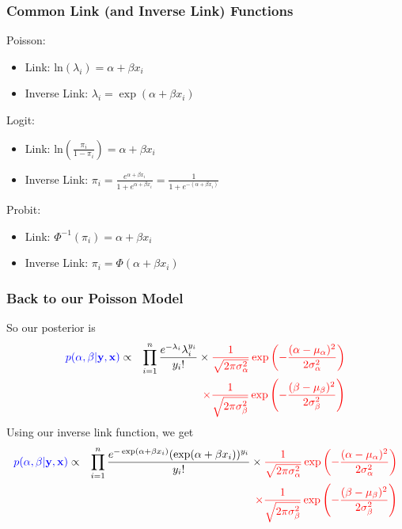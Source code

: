 \documentclass[handout]{beamer}
\begin{document}
\begin{frame}
\frametitle{Common Link (and Inverse Link) Functions}
\pause
Poisson:
\begin{itemize}
\item Link: $\mathrm{ln} (\lambda_i) = \alpha + \beta x_i$
\item Inverse Link: $\lambda_i = \exp (\alpha + \beta x_i)$
\end{itemize}
\pause
Logit:
\begin{itemize}
\item Link: $\mathrm{ln} \left( \frac{\pi_i}{1-\pi_i} \right) = \alpha +
\beta x_i$
\item Inverse Link: $\pi_i = \frac{e^{\alpha + \beta x_i}}{1 + e^{\alpha + \beta x_i}} = \frac{1}{1 + e^{-(\alpha + \beta x_i)}}$
\end{itemize}
\pause
Probit:
\begin{itemize}
\item Link: $\Phi^{-1}(\pi_i) = \alpha + \beta x_i$
\item Inverse Link: $\pi_i = \Phi(\alpha + \beta x_i)$
\end{itemize}
\end{frame}

\begin{frame}
\frametitle{Back to our Poisson Model}
\pause
So our posterior is 
\footnotesize
\begin{eqnarray*}
\textcolor{blue}{p(\alpha, \beta | \mathbf{y}, \mathbf{x})} &\propto&
\prod_{i=1}^n \frac{e^{-\lambda_i} \lambda_i^{y_i}}{y_i !} \times
\textcolor{red}{\frac{1}{\sqrt{2\pi \sigma^2_{\alpha}}} \exp \left(-
\frac{(\alpha - \mu_{\alpha})^2}{2 \sigma_{\alpha}^2}\right)}\\
&\phantom{\propto}& \textcolor{red}{\times \frac{1}{\sqrt{2\pi \sigma^2_{\beta}}} \exp \left(-\frac{(\beta - \mu_{\beta})^2}{2 \sigma_{\beta}^2}\right)} 
\end{eqnarray*}
\pause
\normalsize
Using our inverse link function, we get
\footnotesize
\begin{eqnarray*}
\textcolor{blue}{p(\alpha, \beta | \mathbf{y}, \mathbf{x})} &\propto&
\prod_{i=1}^n \frac{e^{-\exp (\alpha + \beta x_i)} (\exp (\alpha +
\beta x_i))^{y_i}}{y_i !} \times
\textcolor{red}{\frac{1}{\sqrt{2\pi \sigma^2_{\alpha}}} \exp \left(-
\frac{(\alpha - \mu_{\alpha})^2}{2 \sigma_{\alpha}^2}\right)}\\
&\phantom{\propto}& \textcolor{red}{\times \frac{1}{\sqrt{2\pi \sigma^2_{\beta}}} \exp \left(-\frac{(\beta - \mu_{\beta})^2}{2 \sigma_{\beta}^2}\right)} 
\end{eqnarray*}
\end{frame}
\end{document}

